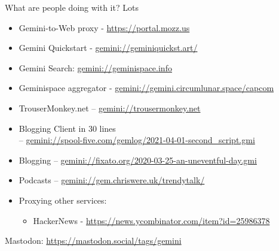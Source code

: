 \documentclass[presentation, 11pt,  aspectratio=169]{beamer}
\begin{document}
\begin{frame}[label={sec:org7c262ba}]{What are people doing with it?}
Lots\\
\begin{itemize}
\item \alert{Gemini-to-Web proxy} - \url{https://portal.mozz.us}\\
\item \alert{Gemini Quickstart} - \href{gemini://geminiquickst.art/}{gemini://geminiquickst.art/}\\
\item \alert{Gemini Search:} \href{gemini://geminispace.info}{gemini://geminispace.info}\\
\item \alert{Geminispace aggregator} - \href{gemini://gemini.circumlunar.space/capcom}{gemini://gemini.circumlunar.space/capcom}\\
\item \alert{TrouserMonkey.net} -- \href{gemini://trousermonkey.net}{gemini://trousermonkey.net}\\
\item \alert{Blogging Client in 30 lines} \\
-- \href{gemini://spool-five.com/gemlog/2021-04-01-second_script.gmi}{gemini://spool-five.com/gemlog/2021-04-01-second_script.gmi}\\
\item \alert{Blogging} -- \href{gemini://fixato.org/2020-03-25-an-uneventful-day.gmi}{gemini://fixato.org/2020-03-25-an-uneventful-day.gmi}\\
\item \alert{Podcasts} -- \href{gemini://gem.chriswere.uk/trendytalk/}{gemini://gem.chriswere.uk/trendytalk/}\\
\item \alert{Proxying other services:}\\
\begin{itemize}
\item HackerNews - \url{https://news.ycombinator.com/item?id=25986378}\\
\end{itemize}
\end{itemize}

Mastodon: \url{https://mastodon.social/tags/gemini}\\
\end{frame}
\end{document}
